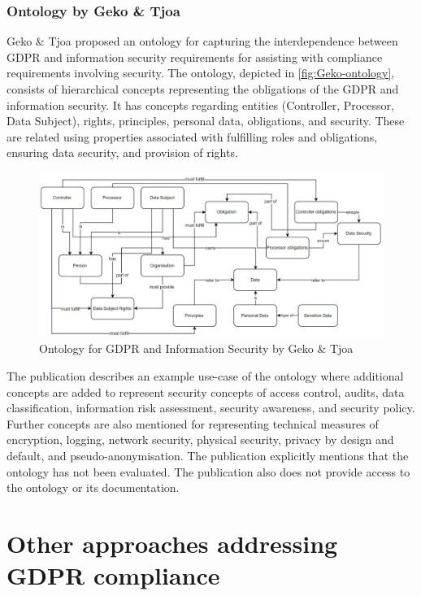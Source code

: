 \subsubsection{Ontology by Geko \& Tjoa}
Geko \& Tjoa \cite{geko_ontology_2018} proposed an ontology for capturing the interdependence between GDPR and information security requirements for assisting with compliance requirements involving security.
The ontology, depicted in \autoref{fig:Geko-ontology}, consists of hierarchical concepts representing the obligations of the GDPR and information security.
It has concepts regarding entities (Controller, Processor, Data Subject), rights, principles, personal data, obligations, and security. These are related using properties associated with fulfilling roles and obligations, ensuring data security, and provision of rights.
\begin{figure}[htbp]
    \centering
    \includegraphics[width=0.8\linewidth]{img/Geko_ontology.png}
    \caption{Ontology for GDPR and Information Security by Geko \& Tjoa \cite{geko_ontology_2018}}
    \label{fig:Geko-ontology}
\end{figure}

The publication describes an example use-case of the ontology where additional concepts are added to represent security concepts of access control, audits, data classification, information risk assessment, security awareness, and security policy. Further concepts are also mentioned for representing technical measures of encryption, logging, network security, physical security, privacy by design and default, and pseudo-anonymisation.
The publication explicitly mentions that the ontology has not been evaluated. The publication also does not provide access to the ontology or its documentation.

\section{Other approaches addressing GDPR compliance}\label{sec:sota:gdpr-other}

